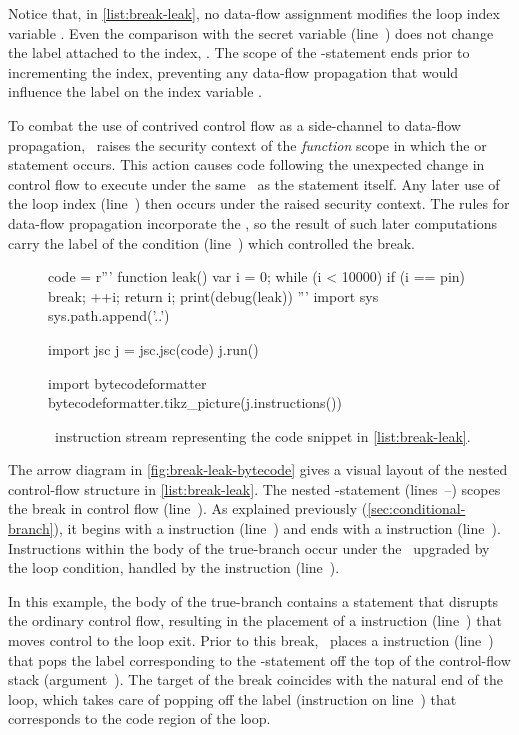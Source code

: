 Notice that, in \autoref{list:break-leak}, no data-flow assignment modifies the loop index variable .
Even the comparison with the secret variable  (line~) does not change the label attached to the index, .
The scope of the -statement ends prior to incrementing the index, preventing any data-flow propagation that would influence the label on the index variable .

To combat the use of contrived control flow as a side-channel to data-flow propagation, \FlowCore\ raises the security context of the \emph{function} scope in which the  or  statement occurs.
This action causes code following the unexpected change in control flow to execute under the same \pclabel\ as the  statement itself.
Any later use of the loop index  (line~) then occurs under the raised security context.
The rules for data-flow propagation incorporate the \pclabel, so the result of such later computations carry the label of the condition (line~) which controlled the break.

\begin{figure}[h]
\begin{python}
code = r'''
function leak() {
  var i = 0;
  while (i < 10000) {
    if (i == pin)
      break;
    ++i;
  }
  return i;
}
print(debug(leak))
'''
import sys
sys.path.append('..')

import jsc
j = jsc.jsc(code)
j.run()

import bytecodeformatter
bytecodeformatter.tikz_picture(j.instructions())
\end{python}
  \caption{\FlowCore\ instruction stream representing the code snippet in \autoref{list:break-leak}.}
  \label{fig:break-leak-bytecode}
\end{figure}

The arrow diagram in \autoref{fig:break-leak-bytecode} gives a visual layout of the nested control-flow structure in \autoref{list:break-leak}.
The nested -statement (lines~--) scopes the break in control flow (line~).
As explained previously (\autoref{sec:conditional-branch}), it begins with a \dup instruction (line~) and ends with a \popj instruction (line~).
Instructions within the body of the true-branch occur under the \pclabel\ upgraded by the loop condition, handled by the \join instruction (line~).

In this example, the body of the true-branch contains a  statement that disrupts the ordinary control flow, resulting in the placement of a  instruction (line~) that moves control to the loop exit.
Prior to this break, \FlowCore\ places a \popj instruction (line~) that pops the label corresponding to the -statement off the top of the control-flow stack (argument~).
The target of the break coincides with the natural end of the loop, which takes care of popping off the label (\popj instruction on line~) that corresponds to the code region of the loop.

